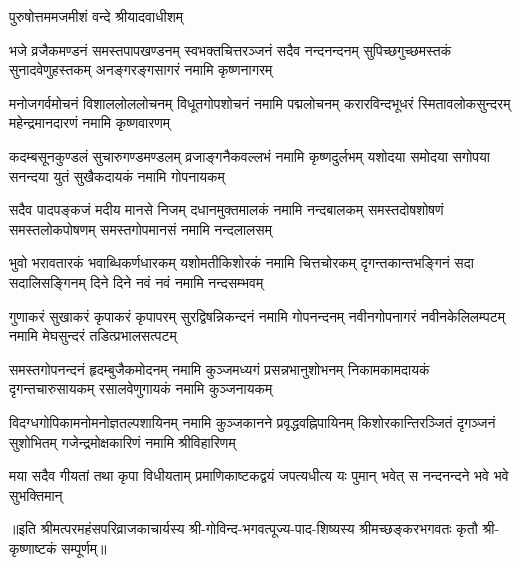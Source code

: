 
{पुरुषोत्तममजमीशं वन्दे श्रीयादवाधीशम्}

\fourlineindentedshloka
{भजे व्रजैकमण्डनं समस्तपापखण्डनम्}
{स्वभक्तचित्तरञ्जनं सदैव नन्दनन्दनम्}
{सुपिच्छगुच्छमस्तकं सुनादवेणुहस्तकम्}
{अनङ्गरङ्गसागरं नमामि कृष्णनागरम्}

\fourlineindentedshloka
{मनोजगर्वमोचनं विशाललोललोचनम्}
{विधूतगोपशोचनं नमामि पद्मलोचनम्}
{करारविन्दभूधरं स्मितावलोकसुन्दरम्}
{महेन्द्रमानदारणं नमामि कृष्णवारणम्}

\fourlineindentedshloka
{कदम्बसूनकुण्डलं सुचारुगण्डमण्डलम्}
{व्रजाङ्गनैकवल्लभं नमामि कृष्णदुर्लभम्}
{यशोदया समोदया सगोपया सनन्दया}
{युतं सुखैकदायकं नमामि गोपनायकम्}

\fourlineindentedshloka
{सदैव पादपङ्कजं मदीय मानसे निजम्}
{दधानमुक्तमालकं नमामि नन्दबालकम्}
{समस्तदोषशोषणं समस्तलोकपोषणम्}
{समस्तगोपमानसं नमामि नन्दलालसम्}

\fourlineindentedshloka
{भुवो भरावतारकं भवाब्धिकर्णधारकम्}
{यशोमतीकिशोरकं नमामि चित्तचोरकम्}
{दृगन्तकान्तभङ्गिनं सदा सदालिसङ्गिनम्}
{दिने दिने नवं नवं नमामि नन्दसम्भवम्}

\fourlineindentedshloka
{गुणाकरं सुखाकरं कृपाकरं कृपापरम्}
{सुरद्विषन्निकन्दनं नमामि गोपनन्दनम्}
{नवीनगोपनागरं नवीनकेलिलम्पटम्}
{नमामि मेघसुन्दरं तडित्प्रभालसत्पटम्}

\fourlineindentedshloka
{समस्तगोपनन्दनं हृदम्बुजैकमोदनम्}
{नमामि कुञ्जमध्यगं प्रसन्नभानुशोभनम्}
{निकामकामदायकं दृगन्तचारुसायकम्}
{रसालवेणुगायकं नमामि कुञ्जनायकम्}

\fourlineindentedshloka
{विदग्धगोपिकामनोमनोज्ञतल्पशायिनम्}
{नमामि कुञ्जकानने प्रवृद्धवह्निपायिनम्}
{किशोरकान्तिरञ्जितं दृगञ्जनं सुशोभितम्}
{गजेन्द्रमोक्षकारिणं नमामि श्रीविहारिणम्}

{मया सदैव गीयतां तथा कृपा विधीयताम्}
{प्रमाणिकाष्टकद्वयं जपत्यधीत्य यः पुमान्}
{भवेत् स नन्दनन्दने भवे भवे सुभक्तिमान्}

॥इति श्रीमत्परमहंसपरिव्राजकाचार्यस्य श्री-गोविन्द-भगवत्पूज्य-पाद-शिष्यस्य
श्रीमच्छङ्करभगवतः कृतौ श्री-कृष्णाष्टकं सम्पूर्णम्॥